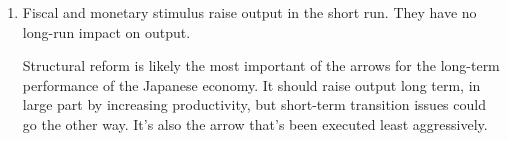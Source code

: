 \begin{enumerate}
\begin{enumerate}
\item Fiscal and monetary stimulus raise output in the short run.
They have no long-run impact on output.

Structural reform is likely the most important of the arrows
for the long-term performance of the Japanese economy.
It should raise output long term, in large part by increasing productivity,
but short-term transition issues could go the other way.
It's also the arrow that's been executed least aggressively.
\end{enumerate}


%
%
%
%
%
%
%
%
%
\end{enumerate}



